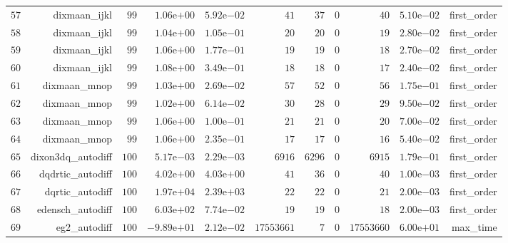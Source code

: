 \documentclass[varwidth=20cm,crop=true]{standalone}
\begin{document}
\begin{longtable}{rrrrrrrrrrr}
  \(    57\) & dixmaan\_ijkl & \(    99\) & \( 1.06\)e\(+00\) & \( 5.92\)e\(-02\) & \(    41\) & \(    37\) & \(     0\) & \(    40\) & \( 5.10\)e\(-02\) & first\_order \\
  \(    58\) & dixmaan\_ijkl & \(    99\) & \( 1.04\)e\(+00\) & \( 1.05\)e\(-01\) & \(    20\) & \(    20\) & \(     0\) & \(    19\) & \( 2.80\)e\(-02\) & first\_order \\
  \(    59\) & dixmaan\_ijkl & \(    99\) & \( 1.06\)e\(+00\) & \( 1.77\)e\(-01\) & \(    19\) & \(    19\) & \(     0\) & \(    18\) & \( 2.70\)e\(-02\) & first\_order \\
  \(    60\) & dixmaan\_ijkl & \(    99\) & \( 1.08\)e\(+00\) & \( 3.49\)e\(-01\) & \(    18\) & \(    18\) & \(     0\) & \(    17\) & \( 2.40\)e\(-02\) & first\_order \\
  \(    61\) & dixmaan\_mnop & \(    99\) & \( 1.03\)e\(+00\) & \( 2.69\)e\(-02\) & \(    57\) & \(    52\) & \(     0\) & \(    56\) & \( 1.75\)e\(-01\) & first\_order \\
  \(    62\) & dixmaan\_mnop & \(    99\) & \( 1.02\)e\(+00\) & \( 6.14\)e\(-02\) & \(    30\) & \(    28\) & \(     0\) & \(    29\) & \( 9.50\)e\(-02\) & first\_order \\
  \(    63\) & dixmaan\_mnop & \(    99\) & \( 1.06\)e\(+00\) & \( 1.00\)e\(-01\) & \(    21\) & \(    21\) & \(     0\) & \(    20\) & \( 7.00\)e\(-02\) & first\_order \\
  \(    64\) & dixmaan\_mnop & \(    99\) & \( 1.06\)e\(+00\) & \( 2.35\)e\(-01\) & \(    17\) & \(    17\) & \(     0\) & \(    16\) & \( 5.40\)e\(-02\) & first\_order \\
  \(    65\) & dixon3dq\_autodiff & \(   100\) & \( 5.17\)e\(-03\) & \( 2.29\)e\(-03\) & \(  6916\) & \(  6296\) & \(     0\) & \(  6915\) & \( 1.79\)e\(-01\) & first\_order \\
  \(    66\) & dqdrtic\_autodiff & \(   100\) & \( 4.02\)e\(+00\) & \( 4.03\)e\(+00\) & \(    41\) & \(    36\) & \(     0\) & \(    40\) & \( 1.00\)e\(-03\) & first\_order \\
  \(    67\) & dqrtic\_autodiff & \(   100\) & \( 1.97\)e\(+04\) & \( 2.39\)e\(+03\) & \(    22\) & \(    22\) & \(     0\) & \(    21\) & \( 2.00\)e\(-03\) & first\_order \\
  \(    68\) & edensch\_autodiff & \(   100\) & \( 6.03\)e\(+02\) & \( 7.74\)e\(-02\) & \(    19\) & \(    19\) & \(     0\) & \(    18\) & \( 2.00\)e\(-03\) & first\_order \\
  \(    69\) & eg2\_autodiff & \(   100\) & \(-9.89\)e\(+01\) & \( 2.12\)e\(-02\) & \(17553661\) & \(     7\) & \(     0\) & \(17553660\) & \( 6.00\)e\(+01\) & max\_time \\

\end{longtable}
\end{document}
